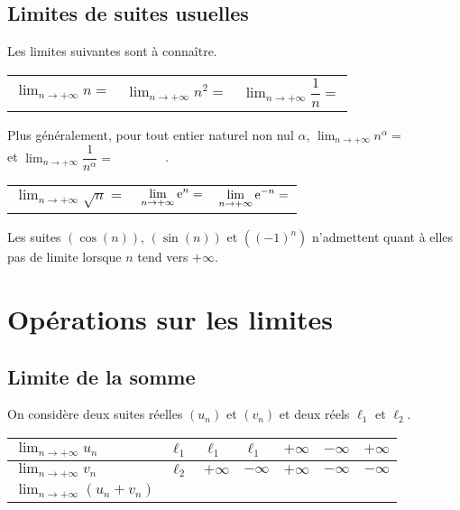 \documentclass[11pt,fleqn]{book} %
\begin{document}
\subsection{Limites de suites usuelles}

\begin{proposition} Les limites suivantes sont à connaître.
\begin{center}
\begin{tabularx}{0.9\linewidth}{XXX}
 $\displaystyle \lim _{n\to+\infty} n = $ & $\displaystyle \lim _{n\to+\infty} n^{2} = $ &  $\displaystyle \lim _{n\to+\infty} \dfrac{1}{n} = $ \end{tabularx}
\end{center}

Plus généralement, pour tout entier naturel non nul $\alpha$, $\displaystyle \lim _{n\to+\infty} n^{\alpha} = \qquad\qquad $ et $\displaystyle \lim _{n\to+\infty} \dfrac{1}{n^{\alpha}} = \qquad\qquad$.
\begin{center}
\begin{tabularx}{0.9\linewidth}{XXX}
  $\displaystyle \lim _{n\to+\infty} \sqrt{n} = $ & $\displaystyle \lim _{n\to+\infty} \mathrm{e}^n = $ & $\displaystyle \lim _{n\to+\infty} \mathrm{e}^{-n} = $\end{tabularx}
\end{center}

 Les suites $(\cos(n))$, $(\sin(n))$ et $((-1)^n)$ n'admettent quant à elles pas de limite lorsque $n$ tend vers $+\infty$.
\end{proposition}

\newpage
\section{Opérations sur les limites}

\subsection{Limite de la somme}

\begin{proposition}On considère deux suites réelles $(u_n)$ et $(v_n)$ et deux réels $\ell_1$ et $\ell_2$. 

\begin{tabularx}{\linewidth}{|l|X|X|X|X|X|X|}
\hline
$\displaystyle \lim_{n \to +\infty} u_n$ & $\ell_1$ & $\ell_1$ & $\ell_1$ & $+\infty$ & $-\infty$ & $+\infty$\\
\hline
$\displaystyle \lim_{n \to +\infty} v_n$ & $\ell_2$ & $+\infty$ & $-\infty$ & $+\infty$ & $-\infty$ & $-\infty$\\
\hline
$\displaystyle \lim_{n \to +\infty} (u_n + v_n)$ & $ $ & $ $ & $ $ & $ $ & $ $ & \\
\hline
\end{tabularx}\end{proposition}
\end{document}
